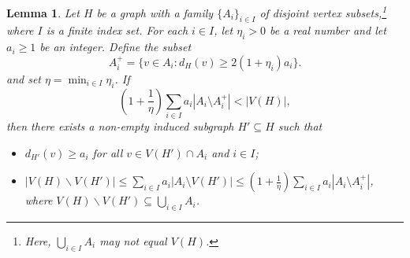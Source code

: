 \documentclass{aic}
\newtheorem{lemma}[dfn]{Lemma}
\begin{document}
	\begin{lemma}\label{Lem:key}
		Let $H$ be a graph with a family $\{A_i\}_{i \in I}$ of disjoint vertex subsets,\footnote{Here, $\bigcup_{i \in I} A_i$ may not equal $V(H)$.} where $I$ is a finite index set.
		For each $i \in I$, let $\eta_i > 0$ be a real number and let $a_i \geq 1$ be an integer. Define the subset
		\[
		A_i^+ = \{v \in A_i : d_H(v) \geq 2(1+\eta_i)a_i\}.
		\]
		and set $\eta = \min_{i \in I} \eta_i$. If
		\begin{equation}\label{equ:key}
			\left(1 + \frac{1}{\eta}\right) \sum_{i \in I} a_i |A_i \setminus A_i^+| < |V(H)|,
		\end{equation}
		then there exists a non-empty induced subgraph $H' \subseteq H$ such that
		\begin{itemize}
			\item [(a)] $d_{H'}(v) \geq a_i$ for all $v \in V(H') \cap A_i$ and $i\in I$;
			\item [(b)] $|V(H)\backslash V(H')| \leq \sum_{i \in I} a_i |A_i \setminus V(H')| \leq \left(1 + \frac{1}{\eta}\right) \sum_{i \in I} a_i |A_i \setminus A_i^+|$, where $V(H)\backslash V(H')\subseteq \bigcup_{i \in I} A_i$.
		\end{itemize}
	\end{lemma}
	
\end{document}
